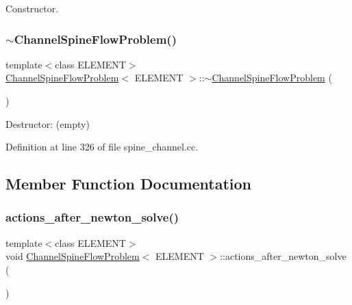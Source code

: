 Constructor. 

\mbox{\label{classChannelSpineFlowProblem_abdf2cc520915167d8718499459df348b}} 
\subsubsection{\texorpdfstring{$\sim$\+Channel\+Spine\+Flow\+Problem()}{~ChannelSpineFlowProblem()}\hspace{0.1cm}{\footnotesize\ttfamily [2/2]}}
{\footnotesize\ttfamily template$<$class E\+L\+E\+M\+E\+NT$>$ \\
\hyperlink{classChannelSpineFlowProblem}{Channel\+Spine\+Flow\+Problem}$<$ E\+L\+E\+M\+E\+NT $>$\+::$\sim$\hyperlink{classChannelSpineFlowProblem}{Channel\+Spine\+Flow\+Problem} (\begin{DoxyParamCaption}{ }\end{DoxyParamCaption})\hspace{0.3cm}{\ttfamily [inline]}}



Destructor\+: (empty) 



Definition at line 326 of file spine\+\_\+channel.\+cc.



\subsection{Member Function Documentation}
\mbox{\label{classChannelSpineFlowProblem_a419a80ef3d19438f193bd7843f72446a}} 
\subsubsection{\texorpdfstring{actions\+\_\+after\+\_\+newton\+\_\+solve()}{actions\_after\_newton\_solve()}\hspace{0.1cm}{\footnotesize\ttfamily [1/2]}}
{\footnotesize\ttfamily template$<$class E\+L\+E\+M\+E\+NT$>$ \\
void \hyperlink{classChannelSpineFlowProblem}{Channel\+Spine\+Flow\+Problem}$<$ E\+L\+E\+M\+E\+NT $>$\+::actions\+\_\+after\+\_\+newton\+\_\+solve (\begin{DoxyParamCaption}{ }\end{DoxyParamCaption})\hspace{0.3cm}{\ttfamily [inline]}}



